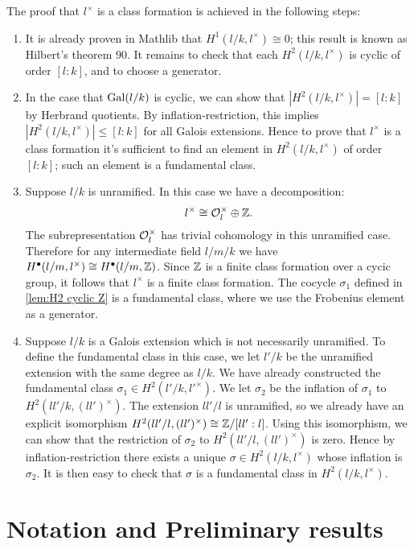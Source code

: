 The proof that $l^\times$ is a class formation is achieved in the following steps:
\begin{enumerate}
	\item
	It is already proven in Mathlib that $H^1(l/k,l^\times) \cong 0$;
	this result is known as Hilbert's theorem 90.
	It remains to check that each $H^2(l/k,l^\times)$ is cyclic of order $[l:k]$, and to
	choose a generator.
	\item
	In the case that $\mathrm{Gal}(l/k)$ is cyclic, we can show that $|H^2(l/k,l^\times)| = [l:k]$ by
	Herbrand quotients. By inflation-restriction, this implies $|H^2(l/k,l^\times)| \le [l:k]$
	for all Galois extensions. Hence to prove that $l^\times$ is a class formation it's sufficient to
	find an element in $H^2(l/k,l^\times)$ of order $[l:k]$; such an element is a fundamental class.
	\item
	Suppose $l/k$ is unramified. In this case we have a decomposition:
	\[
		l ^\times \cong {\mathcal O}_l^\times \oplus {\mathbb Z}.
	\]
	The subrepresentation ${\mathcal O}_l^\times$ has trivial cohomology in this unramified case.
	Therefore for any intermediate field $l/m/k$ we have
	$H^\bullet(l/m,l^\times) \cong H^\bullet(l/m,{\mathbb Z})$.
	Since ${\mathbb Z}$ is a finite class formation over a cycic group, it follows that $l^\times$ is a
	finite class formation.
	The cocycle $\sigma_1$ defined in \ref{lem:H2 cyclic Z} is a fundamental class,
	where we use the Frobenius element as a generator.
	\item
	Suppose $l/k$ is a Galois extension which is not necessarily unramified. To define the
	fundamental class in this case, we let $l'/k$ be the unramified extension with the same degree as
	$l/k$. We have already constructed the fundamental class $\sigma_1 \in H^2(l'/k, l'^\times)$.
	We let $\sigma_2$ be the inflation of $\sigma_1$ to $H^2(ll'/k, (ll')^\times)$.
	The extension $ll' / l$ is unramified, so we already have an explicit isomorphism
	$H^2(ll'/l, (ll')^\times) \cong {\mathbb Z} / [ll':l]$.
	Using this isomorphism, we can show that the restriction of $\sigma_2$
	to $H^2(ll'/l, (ll')^\times)$ is zero.
	Hence by inflation-restriction there exists a unique $\sigma \in H^2(l/k, l^\times)$ whose
	inflation is $\sigma_2$.
	It is then easy to check that $\sigma$ is a fundamental class in $H^2(l/k,l^\times)$.
\end{enumerate}





\section{Notation and Preliminary results}

